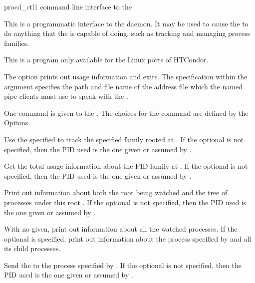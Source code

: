 \begin{ManPage}
{\label{man-procd-ctl}procd\_ctl}{1}
{command line interface to the }

\Synopsis {} 


\Description 

This is a programmatic interface to the  daemon. 
It may be used to 
cause the  to do anything that the 
is capable of doing,
such as tracking and managing process families.

This is a program only available for the Linux ports of HTCondor.

The  option prints out usage information and exits.
The   specification within the  argument
specifies the path and file name of the address file
which the named pipe clients must use to speak with the .

One command is given to the . 
The choices for the command are defined by the Options. 

\begin{Options}

  {Use the specified  to track the specified family rooted at 
  .  
  If the optional  is not specified, 
  then the PID used is the one given or assumed by .}

  {Get the total usage information about the PID family at .
  If the optional  is not specified, 
  then the PID used is the one given or assumed by .}

  {Print out information about both the root  being watched 
  and the tree of processes under this root .
  If the optional  is not specified, 
  then the PID used is the one given or assumed by .}

  {With no  given, print out information about all 
  the watched processes.  
  If the optional  is specified,
  print out information about the process specified by  
  and all its child processes.}

  {Send the  to the process specified by .
  If the optional  is not specified, 
  then the PID used is the one given or assumed by .}


\end{Options}
\end{ManPage}
